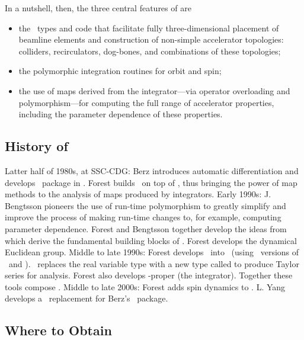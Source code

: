 %
In a nutshell, then, the three central features of \PTC%
 are
\begin{itemize}
  \item the \Fninety\ types and code that facilitate fully three-dimensional
        placement of beamline elements and construction of non-simple
        accelerator topologies: colliders, recirculators, dog-bones,
        and combinations of these topologies;
  \item the polymorphic integration routines for orbit and spin;
  \item the use of maps derived from the integrator---via operator
        overloading and polymorphism---for computing the full range
        of accelerator properties, including the parameter dependence
        of these properties.
\end{itemize}

\subsection{History of \PTC}

Latter half of 1980s, at SSC-CDG: Berz introduces automatic
differentiation and develops \DA\ package in \Fsevens.
Forest builds \LieLib\ on top of \DA, thus bringing the power
of map methods to the analysis of maps produced by integrators.
Early 1990s: J. Bengtsson pioneers the use of run-time polymorphism
to greatly simplify and improve the process of making run-time
changes to, for example, computing parameter dependence.
Forest and Bengtsson together develop the ideas from which derive
the fundamental building blocks of \PTC. Forest develops the
dynamical Euclidean group.
Middle to late 1990s: Forest develops \LieLib\ into \FPP\
(using \LBNL\ versions of \DA\ and \LieLib).
\FPP\ replaces the real variable type  with a new type
called \ptc{real\_8} to produce Taylor series for analysis.
Forest also develops \PTC-proper (the integrator).
Together these tools compose \PTC.
Middle to late 2000s: Forest adds spin dynamics to \PTC.
L. Yang develops a \Cpp\ replacement for Berz's \DA\ package.

\subsection{Where to Obtain \PTC}

